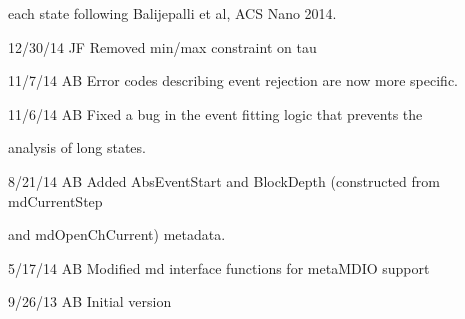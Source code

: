 \documentclass[letterpaper,10pt,english]{sphinxmanual}
\begin{document}
\begin{DUlineblock}{0em}
\begin{DUlineblock}{\DUlineblockindent}
\item[] each state following Balijepalli et al, ACS Nano 2014.
\end{DUlineblock}
\item[] 12/30/14        JF      Removed min/max constraint on tau
\item[] 11/7/14         AB      Error codes describing event rejection are now more specific.
\item[] 11/6/14         AB      Fixed a bug in the event fitting logic that prevents the
\item[]
\begin{DUlineblock}{\DUlineblockindent}
\item[] analysis of long states.
\end{DUlineblock}
\item[] 8/21/14         AB      Added AbsEventStart and BlockDepth (constructed from mdCurrentStep
\item[]
\begin{DUlineblock}{\DUlineblockindent}
\item[] and mdOpenChCurrent) metadata.
\end{DUlineblock}
\item[] 5/17/14         AB  Modified md interface functions for metaMDIO support
\item[] 9/26/13         AB      Initial version
\end{DUlineblock}
\end{document}

